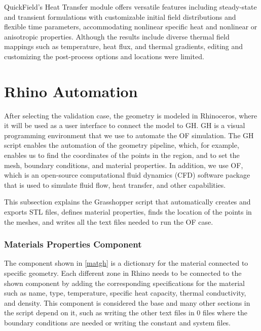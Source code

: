 QuickField's Heat Transfer module offers versatile features including steady-state and transient formulations with customizable initial field distributions and flexible time parameters, accommodating nonlinear specific heat and nonlinear or anisotropic properties. Although the results include diverse thermal field mappings such as temperature, heat flux, and thermal gradients, editing and customizing the post-process options and locations were limited.




\section{Rhino  Automation} %
After selecting the validation case, the geometry is modeled in Rhinoceros, where it will be used as a user interface to connect the model to \gls{GH}. \gls{GH} is a visual programming environment that we use to automate the \gls{OF} simulation. 
The \gls{GH} script enables the automation of the geometry pipeline, which, for example, enables us to find the coordinates of the points in the region, and to set the mesh, boundary conditions, and material properties. 
In addition, we use \gls{OF}, which is an open-source computational fluid dynamics (CFD) software package that is used to simulate fluid flow, heat transfer, and other capabilities. 


This subsection explains the Grasshopper script that automatically creates and exports STL files, defines material properties, finds the location of the points in the meshes, and writes all the text files needed to run the \gls{OF} case.

\subsubsection{Materials Properties Component}
The component shown in \ref{matgh} is a dictionary for the material connected to specific geometry. Each different zone in Rhino needs to be connected to the shown component by adding the corresponding specifications for the material such as name, type, temperature, specific heat capacity, thermal conductivity, and density. This component is considered the base and many other sections in the script depend on it, such as writing the other text files in 0 files where the boundary conditions are needed or writing the constant and system files. 


